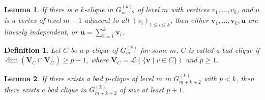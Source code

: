 \documentclass[10pt,a4paper]{amsart}
\newtheorem{lemma}{Lemma}
\newtheorem{definition}{Definition}
\begin{document}
\begin{lemma}\label{lemma: independent or sum}
    If there is a $k$-clique  in $G^{(k)}_{m+2}$ of level $m$ with vertices $v_1, \ldots, v_k$, and $u$ is a vertex of level $m+1$ adjacent to all ${(v_i)}_{1 \le  i \le k}$,
    then either $\mathbf{v}_1, \ldots, \mathbf{v}_k, \mathbf{u}$ are linearly independent, or $\mathbf{u} = \sum_{i=1}^{k}\mathbf{v}_i$.
\end{lemma}

\begin{definition}\label{D2}
    Let $C$ be a $p$-clique of $G^{(k)}_{m}$ for some $m$. $C$ is called a \emph{bad} clique if $\dim(\textbf{V}_C \cap \textbf{V}_C^{\perp})\ge p-1$, where
    $\textbf{V}_C=\mathcal{L}(\{\mathbf{v}\mid v\in C\})$ and $p\ge 1$.
    \end{definition}

\begin{lemma}\label{lemma: 0 sol independence}
        If there exists a bad $p$-clique of level $m$ in $G^{(k)}_{m+k+2}$ with $p < k$,
    then there exists a bad clique in $G^{(k)}_{m+k+2}$ of size at least $p+1$.
\end{lemma}
\end{document}
